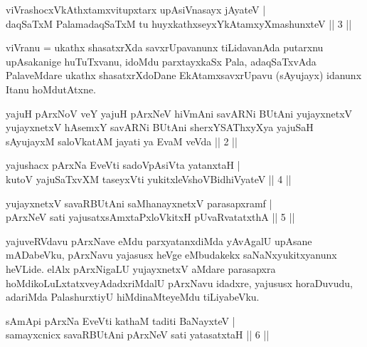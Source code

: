 \begin{shl}
viVrashocxVkAthxtamxvitupxtarx upAsiVnasayx jAyateV | \\
daqSaTxM PalamadaqSaTxM tu huyxkathxseyxYkAtamxyXmashunxteV \hfill ||  3 || 
\end{shl}

\begin{artha}
viVranu = ukathx shasatxrXda savxrUpavanunx tiLidavanAda putarxnu upAsakanige huTuTxvanu, idoMdu parxtayxkaSx Pala, adaqSaTxvAda PalaveMdare ukathx shasatxrXdoDane EkAtamxsavxrUpavu (sAyujayx) idanunx Itanu hoMdutAtxne.
\end{artha}

\begin{kandikeshl}
yajuH pArxNoV veY yajuH pArxNeV hiVmAni savARNi BUtAni yujayxnetxV yujayxnetxV hAsemxY savARNi BUtAni sherxYSAThxyXya yajuSaH sAyujayxM saloVkatAM jayati ya EvaM veVda || 2 ||
\end{kandikeshl}


\begin{shl}
yajushacx pArxNa EveVti sadoVpAsiVta yatanxtaH | \\
kutoV yajuSaTxvXM taseyxVti yukitxleVshoV\s BidhiVyateV \hfill ||  4 || 
\end{shl}

\begin{shl}
yujayxnetxV savaRBUtAni saMhanayxnetxV parasapxramf | \\
pArxNeV sati yajusatxsAmxtaPxloVkitxH pUvaRvatatxthA \hfill ||  5 || 
\end{shl}

\begin{artha}
yajuveRVdavu pArxNave eMdu parxyatanxdiMda yAvAgalU upAsane mADabeVku, pArxNavu yajasusx heVge eMbudakekx saNaNxyukitxyanunx heVLide. elAlx pArxNigaLU yujayxnetxV aMdare parasapxra hoMdikoLuLxtatxveyAdadxriMdalU pArxNavu idadxre, yajususx horaDuvudu, adariMda PalashurxtiyU hiMdinaMteyeMdu tiLiyabeVku.
\end{artha}

\begin{shl}
sAmApi pArxNa EveVti kathaM taditi BaNayxteV | \\
samayxcnicx savaRBUtAni pArxNeV sati yatasatxtaH \hfill ||  6 || 
\end{shl}

